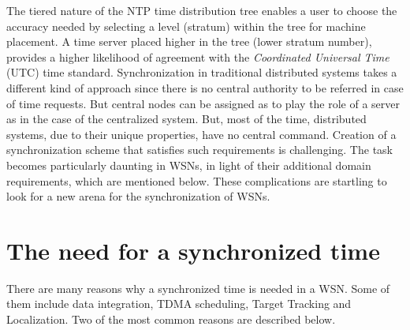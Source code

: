 \documentclass[a4paper,10pt]{report}
\begin{document}
The tiered nature of the NTP time distribution tree enables a user
to choose the accuracy needed by selecting a level (stratum) within
the tree for machine placement. A time server placed higher in the
tree (lower stratum number), provides a higher likelihood of
agreement with the \textit{Coordinated Universal Time} (UTC) time
standard.
\newline
Synchronization in traditional distributed systems takes a different
kind of approach since there is no central authority to be referred
in case of time requests. But central nodes can be assigned as to
play the role of a server as in the case of the centralized system.
But, most of the time, distributed systems, due to their unique
properties, have no central command. Creation of a synchronization
scheme that satisfies such requirements is challenging. The task
becomes particularly daunting in WSNs, in light of their additional
domain requirements, which are mentioned below. These complications
are startling to look for a new arena for the synchronization of
WSNs.
\section{\textbf{The need for a synchronized time}}
There are many reasons why a synchronized time is needed in a WSN.
Some of them include data integration, TDMA scheduling, Target
Tracking and Localization. Two of the most common reasons are described below.
\end{document}
